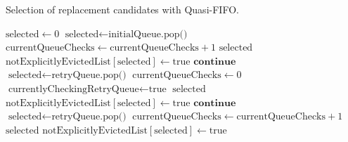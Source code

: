 \begin{@empty}
    \begin{algorithm}[ht!]
        \caption{Selection of replacement candidates with Quasi-FIFO.}
        \label{alg:FIFOselect}
        \scriptsize
        \begin{algorithmic}[1]
                \State $\text{selected} \gets 0$
                            \State $\text{selected} \gets \text{initialQueue.pop()}$
                            \State $\text{currentQueueChecks} \gets \text{currentQueueChecks} + 1$
                                \Return $\text{selected}$
                            \Else
                                \State $\text{notExplicitlyEvictedList}\left[\text{selected}\right] \gets \text{true}$
                                \State $\textbf{continue}$
                            \EndIf
                        \Else
                            \State $\text{selected} \gets \text{retryQueue.pop()}$
                                \State $\text{currentQueueChecks} \gets 0$
                                \State $\text{currentlyCheckingRetryQueue} \gets \text{true}$
                                \Return $\text{selected}$
                            \Else
                                \State $\text{notExplicitlyEvictedList}\left[\text{selected}\right] \gets \text{true}$
                                \State $\textbf{continue}$
                            \EndIf            
                        \EndIf
                    \Else
                            \State $\text{selected} \gets \text{retryQueue.pop()}$
                            \State $\text{currentQueueChecks} \gets \text{currentQueueChecks} + 1$
                                \Return $\text{selected}$
                            \Else
                                \State $\text{notExplicitlyEvictedList}\left[\text{selected}\right] \gets \text{true}$

\end{algorithmic}
\end{algorithm}
\end{@empty}
